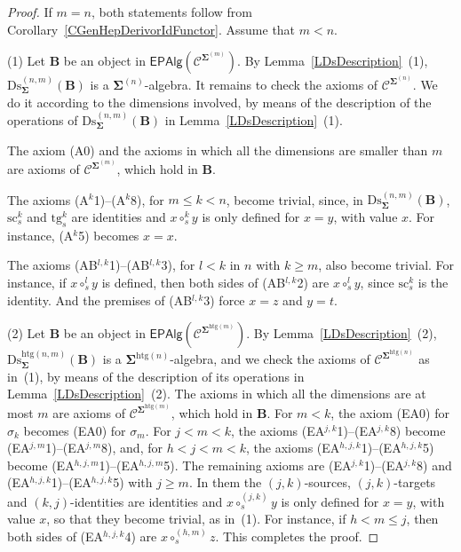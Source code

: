\documentclass[a4paper, reqno]{amsbook}
\newcommand{\sig}[1]{\mathbf{#1}}             %
\newcommand{\spec}[1]{\boldsymbol{\mathcal{#1}}} %
\newcommand{\htg}{\mathrm{htg}}                %
\newcommand{\src}{\mathrm{sc}}
\newcommand{\tgt}{\mathrm{tg}}
\newcommand{\Ds}{\mathrm{Ds}}
\theoremstyle{plain}
\theoremstyle{definition}
\begin{document}
\begin{proof}
If $m=n$, both statements follow from Corollary~\ref{CGenHepDerivorIdFunctor}.
Assume that $m<n$.

(1) Let $\mathbf{B}$ be an object in $\mathsf{EPAlg}(\spec{C}^{\sig{\Sigma}^{(m)}})$.
By Lemma~\ref{LDsDescription}~(1), $\Ds^{(n,m)}_{\sig{\Sigma}}(\mathbf{B})$ is a $\sig{\Sigma}^{(n)}$-algebra.
It remains to check the axioms of $\spec{C}^{\sig{\Sigma}^{(n)}}$.
We do it according to the dimensions involved, by means of the description of the operations of $\Ds^{(n,m)}_{\sig{\Sigma}}(\mathbf{B})$ in Lemma~\ref{LDsDescription}~(1).

The axiom (A0) and the axioms in which all the dimensions are smaller than $m$ are axioms of $\spec{C}^{\sig{\Sigma}^{(m)}}$, which hold in $\mathbf{B}$.

The axioms (A$^{k}$1)--(A$^{k}$8), for $m\leq k<n$, become trivial, since, in $\Ds^{(n,m)}_{\sig{\Sigma}}(\mathbf{B})$, $\src^{k}_{s}$ and $\tgt^{k}_{s}$ are identities and $x\circ^{k}_{s}y$ is only defined for $x=y$, with value $x$.
For instance, (A$^{k}$5) becomes $x=x$.

The axioms (AB$^{l,k}$1)--(AB$^{l,k}$3), for $l<k$ in $n$ with $k\geq m$, also become trivial.
For instance, if $x\circ^{l}_{s}y$ is defined, then both sides of (AB$^{l,k}$2) are $x\circ^{l}_{s}y$, since $\src^{k}_{s}$ is the identity.
And the premises of (AB$^{l,k}$3) force $x=z$ and $y=t$.

(2) Let $\mathbf{B}$ be an object in $\mathsf{EPAlg}(\spec{C}^{\sig{\Sigma}^{\htg(m)}})$.
By Lemma~\ref{LDsDescription}~(2), $\Ds^{\htg(n,m)}_{\sig{\Sigma}}(\mathbf{B})$ is a $\sig{\Sigma}^{\htg(n)}$-algebra, and we check the axioms of $\spec{C}^{\sig{\Sigma}^{\htg(n)}}$ as in~(1), by means of the description of its operations in Lemma~\ref{LDsDescription}~(2).
The axioms in which all the dimensions are at most $m$ are axioms of $\spec{C}^{\sig{\Sigma}^{\htg(m)}}$, which hold in $\mathbf{B}$.
For $m<k$, the axiom (EA0) for $\sigma_{k}$ becomes (EA0) for $\sigma_{m}$.
For $j<m<k$, the axioms (EA$^{j,k}$1)--(EA$^{j,k}$8) become (EA$^{j,m}$1)--(EA$^{j,m}$8), and, for $h<j<m<k$, the axioms (EA$^{h,j,k}$1)--(EA$^{h,j,k}$5) become (EA$^{h,j,m}$1)--(EA$^{h,j,m}$5).
The remaining axioms are (EA$^{j,k}$1)--(EA$^{j,k}$8) and (EA$^{h,j,k}$1)--(EA$^{h,j,k}$5) with $j\geq m$.
In them the $(j,k)$-sources, $(j,k)$-targets and $(k,j)$-identities are identities and $x\circ^{(j,k)}_{s}y$ is only defined for $x=y$, with value $x$, so that they become trivial, as in~(1).
For instance, if $h<m\leq j$, then both sides of (EA$^{h,j,k}$4) are $x\circ^{(h,m)}_{s}z$. This completes the proof.
\end{proof}
\end{document}
